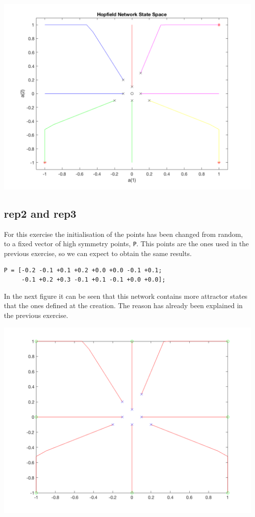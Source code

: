 \documentclass[10pt]{article}
\begin{document}
\begin{multicols}{2}
\begin{center}
	\includegraphics[width=0.8\linewidth]{img/stable2}
\end{center}

\subsection*{rep2 and rep3}

For this exercise the initialisation of the points has been changed from random, to a fixed vector of high 
symmetry points, \texttt{P}. This points are the ones used in the previous exercise, so we can expect to obtain the same results.

\begin{verbatim}
P = [-0.2 -0.1 +0.1 +0.2 +0.0 +0.0 -0.1 +0.1;  
     -0.1 +0.2 +0.3 -0.1 +0.1 -0.1 +0.0 +0.0];
\end{verbatim}

In the next figure it can be seen that this network contains more attractor states that the ones defined at
the creation. The reason has already been explained in the previous exercise.

\begin{center}
	\includegraphics[width=0.8\linewidth]{img/rep2}
\end{center}


\end{multicols}
\end{document}

